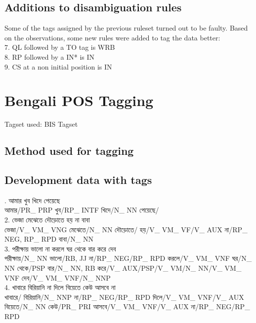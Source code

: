 \documentclass[11pt,a4paper,twocolumn]{article}
\begin{document}
	\subsection{Additions to disambiguation rules}
	Some of the tags assigned by the previous ruleset turned
	out to be faulty. Based on the observations, some new rules
	were added to tag the data better:\\
	7. QL followed by a TO tag is WRB\\
	8. RP followed by a IN* is IN\\
	9. CS at a non initial position is IN	\\
	\section{Bengali POS Tagging}
	Tagset used: BIS Tagset
	\subsection{Method used for tagging}

	\subsection{Development data with tags}
	{. \textcolor{diff}{আমার খুব খিদে পেয়েছে} \\
	আমার/\textcolor{hlit}{PR\_ PRP}
	খুব/\textcolor{hlit}{RP\_ INTF}
	খিদে/\textcolor{hlit}{N\_ NN}
	পেয়েছে/\textcolor{hlit}{}\\
	$ $\\
	2. \textcolor{diff}{ভেজা মেঝেতে দৌড়োতে হয় না বাবা} \\
	ভেজা/\textcolor{hlit}{V\_ VM\_ VNG}
	মেঝেতে/\textcolor{hlit}{N\_ NN}
	দৌড়োতে/\textcolor{hlit}{}
	হয়/\textcolor{hlit}{V\_ VM\_ VF/V\_ AUX}
	না/\textcolor{hlit}{RP\_ NEG, RP\_ RPD}
	বাবা/\textcolor{hlit}{N\_ NN}\\
	$ $\\
	3. \textcolor{diff}{পরীক্ষায় ভালো না করলে ঘর থেকে বার করে দেব} \\
	পরীক্ষায়/\textcolor{hlit}{N\_ NN}
	ভালো/\textcolor{hlit}{RB, JJ}
	না/\textcolor{hlit}{RP\_ NEG/RP\_ RPD}
	করলে/\textcolor{hlit}{V\_ VM\_ VNF}
	ঘর/\textcolor{hlit}{N\_ NN}
	থেকে/\textcolor{hlit}{PSP}
	বার/\textcolor{hlit}{N\_ NN, RB}
	করে/\textcolor{hlit}{V\_ AUX/PSP/V\_ VM/N\_ NN/V\_ VM\_ VNF}
	দেব/\textcolor{hlit}{V\_ VM\_ VNF/N\_ NNP}\\
	$ $\\
	4. \textcolor{diff}{খাবারে বিরিয়ানি না দিলে বিয়েতে কেউ আসবে না} \\
	খাবারে/\textcolor{hlit}{}
	বিরিয়ানি/\textcolor{hlit}{N\_ NNP}
	না/\textcolor{hlit}{RP\_ NEG/RP\_ RPD}
	দিলে/\textcolor{hlit}{V\_ VM\_ VNF/V\_ AUX}
	বিয়েতে/\textcolor{hlit}{N\_ NN}
	কেউ/\textcolor{hlit}{PR\_ PRI}
	আসবে/\textcolor{hlit}{V\_ VM\_ VNF/V\_ AUX}
	না/\textcolor{hlit}{RP\_ NEG/RP\_ RPD}\\
	
	
	}
\end{document}
